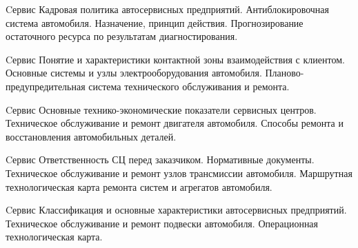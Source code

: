 \documentclass[
	11pt,
	a4paper,
	]
	{article}
\begin{document}
\begin{minipage}[t][\miniH]{\miniL}\centering
	 {Cервис}
		{
			Кадровая политика автосервисных предприятий.
		}{
			Антиблокировочная система автомобиля. Назначение, принцип действия.
		}{
			Прогнозирование остаточного ресурса по результатам диагностирования.
		}
	\lowGE
\end{minipage}

\vfill



\begin{minipage}[t][\miniH]{\miniL}\centering
	 {Cервис}
		{
			Понятие и характеристики контактной зоны взаимодействия с клиентом.
		}{
			Основные системы и узлы электрооборудования автомобиля.
		}{
			Планово-предупредительная система технического обслуживания и ремонта.
		}
	\lowGE
\end{minipage}

\vfill



\begin{minipage}[t][\miniH]{\miniL}\centering
	 {Cервис}
		{
			Основные технико-экономические показатели сервисных центров.
		}{
			Техническое обслуживание и ремонт двигателя автомобиля.
		}{
			Способы ремонта и восстановления автомобильных деталей.
		}
	\lowGE
\end{minipage}





\begin{minipage}[t][\miniH]{\miniL}\centering
	 {Cервис}
		{
			Ответственность СЦ перед заказчиком. Нормативные документы.
		}{
			Техническое обслуживание и ремонт узлов трансмиссии автомобиля.
		}{
			Маршрутная технологическая карта ремонта систем и агрегатов автомобиля.
		}
	\lowGE
\end{minipage}

\vfill



\begin{minipage}[t][\miniH]{\miniL}\centering
	 {Cервис}
		{
			Классификация и основные характеристики автосервисных предприятий.
		}{
			Техническое обслуживание и ремонт подвески автомобиля.
		}{
			Операционная технологическая карта.
		}
	\lowGE
\end{minipage}

\vfill
\end{document}
